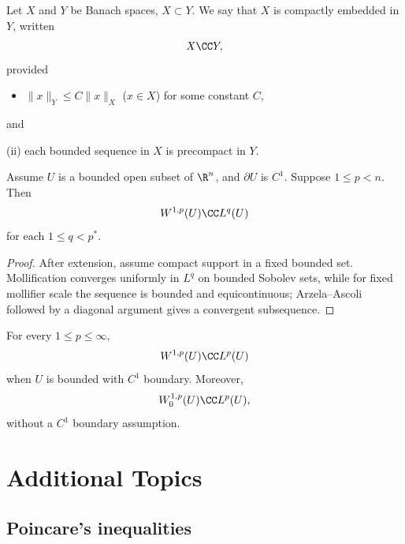 \begin{definition}
\label{def:compact-embedding}
Let $X$ and $Y$ be Banach spaces, $X \subset Y$. We say that $X$ is compactly embedded in $Y$, written
$$X \CC Y,$$
provided
\begin{itemize}
\item[(i)] $\|x\|_Y \le C\|x\|_X$ ($x \in X$) for some constant $C$,
\end{itemize}
and

(ii) each bounded sequence in $X$ is precompact in $Y$.
\end{definition}

\begin{theorem}
\label{thm:rellich-kondrachov}
Assume $U$ is a bounded open subset of $\R^n$, and $\partial U$ is $C^1$. Suppose $1 \le p < n$. Then
$$W^{1,p}(U) \CC L^q(U)$$
for each $1 \le q < p^*$.
\end{theorem}

\begin{proof}
\sketch After extension, assume compact support in a fixed bounded set. Mollification converges uniformly in $L^q$ on bounded Sobolev sets, while for fixed mollifier scale the sequence is bounded and equicontinuous; Arzela--Ascoli followed by a diagonal argument gives a convergent subsequence.
\end{proof}

\begin{remark}
\label{rem:compact-embedding-lp-all-p}
For every $1\le p\le\infty$,
$$W^{1,p}(U) \CC L^p(U)$$
when $U$ is bounded with $C^1$ boundary. Moreover,
$$W_0^{1,p}(U) \CC L^p(U),$$
without a $C^1$ boundary assumption.
\end{remark}

\section{Additional Topics}
\label{sec:sobolev-additional-topics}

\subsection{Poincare's inequalities}

